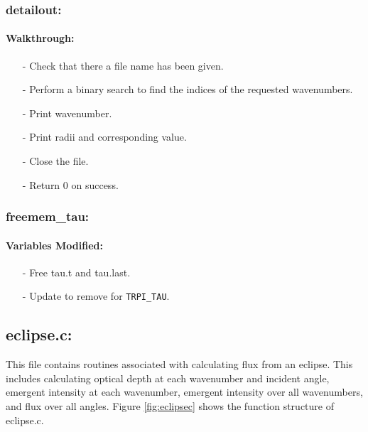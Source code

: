 \documentclass[letterpaper,12pt]{article}
\begin{document}
\subsubsection{detailout:}
\paragraph{Walkthrough:}
\begin{enumerate}[leftmargin=10pt, noitemsep, parsep=0pt, topsep=0ex]
\item[-] Check that there a file name has been given.
\item[-] Perform a binary search to find the indices of the requested wavenumbers.
\item[-] Print wavenumber.
\item[-] Print radii and corresponding value.
\item[-] Close the file.
\item[-] Return 0 on success.
\end{enumerate}

\subsubsection{freemem\_tau:}
\paragraph{Variables Modified:}
\begin{enumerate}[leftmargin=10pt, noitemsep, parsep=0pt, topsep=0ex]
\item[-] Free tau.t and tau.last.
\item[-]  Update  to remove for {\tt TRPI\_TAU}.
\end{enumerate}
\newpage

\subsection{eclipse.c:}
This file contains routines associated with calculating flux from an eclipse. This includes calculating optical depth at each wavenumber and incident angle, emergent intensity at each wavenumber, emergent intensity over all wavenumbers, and flux over all angles. Figure \ref{fig:eclipsec} shows the function structure of eclipse.c.
\end{document}
